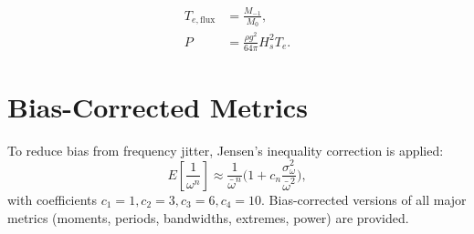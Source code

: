 \documentclass[11pt]{article}
\begin{document}
\begin{align}
T_{e,\text{flux}} &= \frac{M_{-1}}{M_0}, \\
P &= \frac{\rho g^2}{64 \pi} H_s^2 T_e.
\end{align}

\section{Bias-Corrected Metrics}

To reduce bias from frequency jitter, Jensen’s inequality correction is applied:
\[
E\!\left[\frac{1}{\omega^n}\right] \approx 
\frac{1}{\bar{\omega}^n}\Big(1 + c_n \frac{\sigma_\omega^2}{\bar{\omega}^2}\Big),
\]
with coefficients $c_1=1, c_2=3, c_3=6, c_4=10$.  
Bias-corrected versions of all major metrics (moments, periods, bandwidths, extremes, power) are provided.
\end{document}
